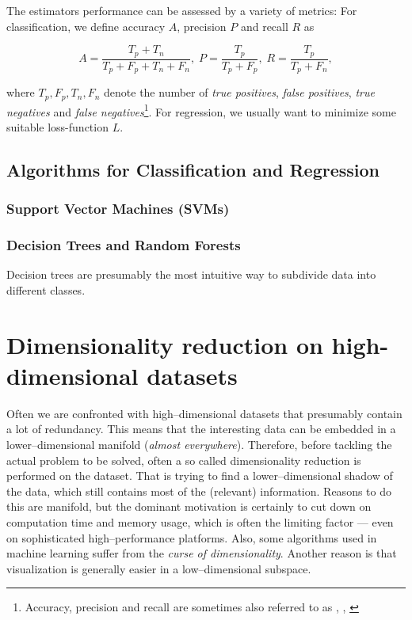 The estimators performance can be assessed by a variety of metrics: For classification, we define accuracy $A$, precision $P$ and recall $R$ as

\begin{equation}
A = \frac{T_p + T_n}{T_p + F_p + T_n + F_n}, \; P = \frac{T_p}{T_p + F_p}, \; R = \frac{T_p}{T_p + F_n},
\end{equation}

where $T_p, F_p, T_n, F_n$ denote the number of \emph{true positives}, \emph{false positives}, \emph{true negatives} and \emph{false negatives}\todo{}\footnote{Accuracy, precision and recall are sometimes also referred to as \emph{}, \emph{}, \emph{}}. For regression, we usually want to minimize some suitable loss-function $L$.

\subsection{Algorithms for Classification and Regression}
\subsubsection{Support Vector Machines (SVMs)}
\subsubsection{Decision Trees and Random Forests}

Decision trees are presumably the most intuitive way to subdivide data into different classes.

\section{Dimensionality reduction on high-dimensional datasets}
\label{sec:dimensionality-reduction}

Often we are confronted with high--dimensional datasets that presumably contain a lot of redundancy. This means that the interesting data can be embedded in a lower--dimensional manifold (\emph{almost everywhere}). Therefore, before tackling the actual problem to be solved, often a so called dimensionality reduction is performed on the dataset. That is trying to find a lower--dimensional shadow of the data, which still contains most of the (relevant) information. Reasons to do this are manifold, but the dominant motivation is certainly to cut down on computation time and memory usage, which is often the limiting factor --- even on sophisticated high--performance platforms. Also, some algorithms used in machine learning suffer from the \emph{curse of dimensionality}. Another reason is that visualization is generally easier in a low--dimensional subspace.\\

